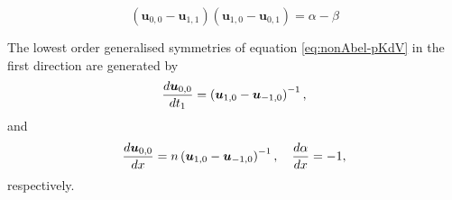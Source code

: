 \documentclass[10pt,a4paper]{amsart}
\newcommand{\bs}{\boldsymbol}
\begin{document}
	\begin{equation} \label{eq:nonAbel-pKdV}
		\left({\bs{u}}_{0,0} - {\bs{u}}_{1,1}\right) \left( {\bs{u}}_{1,0}-{\bs{u}}_{0,1}\right) = \alpha - \beta
	\end{equation}

	\begin{proposition}
		The lowest order generalised symmetries of equation \eqref{eq:nonAbel-pKdV} in the first direction are generated by
		\begin{equation} \label{eq:sym1-pKdV}
			\frac{{\rm{d}} {\bs{u}}_{0,0}}{{\rm{d}} t_1} =  \left({\bs{u}}_{1,0}- {\bs{u}}_{-1,0}\right)^{-1},
		\end{equation}
		and
		\begin{equation} \label{eq:mast-sym-pKdV}
			\frac{{\rm{d}} {\bs{u}}_{0,0}}{{\rm{d}} x} =  n \left({\bs{u}}_{1,0}- {\bs{u}}_{-1,0}\right)^{-1}, ~~~ 	\frac{{\rm{d}} \alpha}{{\rm{d}} x} = -1,
		\end{equation}
		respectively.
	\end{proposition}
\end{document}
